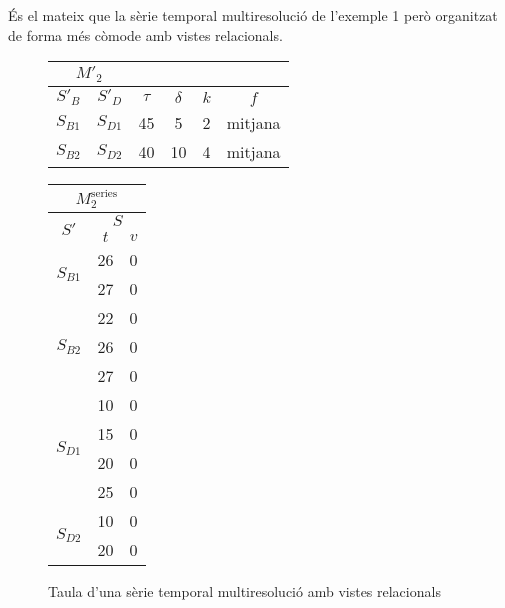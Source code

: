 És el mateix que la sèrie temporal multiresolució de l'exemple 1 però
organitzat de forma més còmode amb vistes relacionals.


\begin{figure}[tp]
  \centering
  \begin{tabular}{|c|c|c|c|c|c|}
    \multicolumn{2}{c}{$M'_2$} \\ \hline
    $S'_B$  & $S'_D$ & $\tau$ & $\delta$ & $k$ & $f$ \\ \hline
    $S_{B1}$ & $S_{D1}$ & 45 & 5  & 2 & mitjana  \\
    $S_{B2}$ & $S_{D2}$ & 40 & 10 & 4 & mitjana  \\ \hline
  \end{tabular}\qquad
  \begin{tabular}{|c|c|c|}
    \multicolumn{3}{c}{$M^{\text{series}}_{2}$} \\ \hline
    \multirow{2}{*}{$S'$}  &  \multicolumn{2}{c|}{$S$} \\ \cline{2-3}
    & $t$      & $v$  \\ \hline
    \multirow{2}{*}{$S_{B1}$} 
    & 26 & 0 \\ 
    & 27 & 0 \\ \hline
    \multirow{3}{*}{$S_{B2}$} 
    & 22 & 0 \\ 
    & 26 & 0 \\ 
    & 27 & 0 \\ \hline
    \multirow{4}{*}{$S_{D1}$} 
    & 10 & 0 \\ 
    & 15 & 0 \\ 
    & 20 & 0 \\ 
    & 25 & 0 \\ \hline
    \multirow{2}{*}{$S_{D2}$} 
    & 10 & 0 \\ 
    & 20 & 0 \\ \hline
  \end{tabular}
  \caption{Taula d'una sèrie temporal multiresolució amb vistes relacionals}
  \label{fig:model:stm:vistes}
\end{figure}





